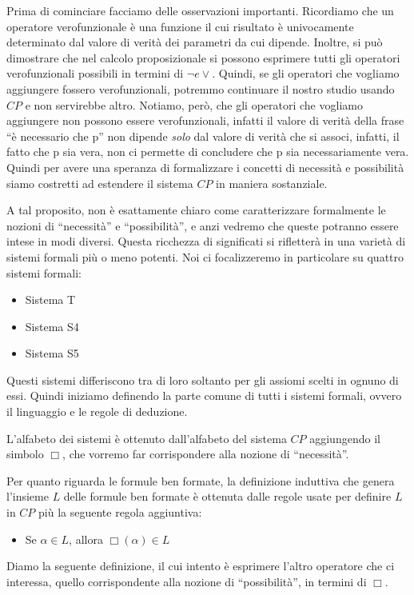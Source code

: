 \documentclass[a4paper, 12pt]{article}
\begin{document}
Prima di cominciare facciamo delle osservazioni importanti.
Ricordiamo che un operatore verofunzionale è una funzione il cui risultato
è univocamente determinato dal valore di verità dei parametri da cui dipende.
Inoltre, si può dimostrare che nel calcolo proposizionale si possono esprimere
tutti gli operatori verofunzionali possibili in termini di $\neg e \vee$.
Quindi, se gli operatori che vogliamo aggiungere fossero verofunzionali, potremmo
continuare il nostro studio usando $CP$ e non servirebbe altro.
Notiamo, però, che gli operatori che vogliamo aggiungere non possono essere verofunzionali,
infatti il valore di verità della frase ``è necessario che p'' non dipende \textit{solo}
dal valore di verità che si associ, infatti, il fatto che p sia vera, non ci permette
di concludere che p sia necessariamente vera. Quindi per avere una speranza di formalizzare
i concetti di necessità e possibilità siamo costretti ad estendere il sistema $CP$
in maniera sostanziale.

A tal proposito, non è esattamente chiaro come caratterizzare formalmente
le nozioni di ``necessità'' e ``possibilità'', e anzi vedremo che queste potranno essere
intese in modi diversi.
Questa ricchezza di significati si rifletterà in una varietà di sistemi formali più o meno potenti.
Noi ci focalizzeremo in particolare su quattro sistemi formali:
\begin{itemize}
\item Sistema T
\item Sistema S4
\item Sistema S5
\end{itemize}

Questi sistemi differiscono tra di loro soltanto per gli assiomi scelti in ognuno di essi.
Quindi iniziamo definendo la parte comune di tutti i sistemi formali, ovvero il linguaggio
e le regole di deduzione.

L'alfabeto dei sistemi è ottenuto dall'alfabeto del sistema $CP$ aggiungendo il simbolo $\Box$,
che vorremo far corrispondere alla nozione di ``necessità''.

Per quanto riguarda le formule ben formate, la definizione induttiva che genera l'insieme $L$
delle formule ben formate è ottenuta dalle regole usate per definire $L$ in $CP$ più
la seguente regola aggiuntiva:
\begin{itemize}
\item Se $\alpha \in L$, allora $\Box (\alpha) \in L$
\end{itemize}

Diamo la seguente definizione, il cui intento è esprimere l'altro operatore
che ci interessa, quello corrispondente alla nozione di ``possibilità'', in termini di $\Box$.
\end{document}

